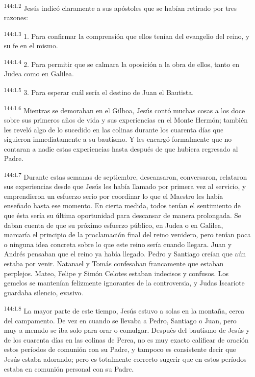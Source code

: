 \par
\textsuperscript{144:1.2} Jesús indicó claramente a sus apóstoles que se habían retirado por tres razones:

\par
\textsuperscript{144:1.3} 1. Para confirmar la comprensión que ellos tenían del evangelio del reino, y su fe en el mismo.

\par
\textsuperscript{144:1.4} 2. Para permitir que se calmara la oposición a la obra de ellos, tanto en Judea como en Galilea.

\par
\textsuperscript{144:1.5} 3. Para esperar cuál sería el destino de Juan el Bautista.

\par
\textsuperscript{144:1.6} Mientras se demoraban en el Gilboa, Jesús contó muchas cosas a los doce sobre sus primeros años de vida y sus experiencias en el Monte Hermón; también les reveló algo de lo sucedido en las colinas durante los cuarenta días que siguieron inmediatamente a su bautismo. Y les encargó formalmente que no contaran a nadie estas experiencias hasta después de que hubiera regresado al Padre.

\par
\textsuperscript{144:1.7} Durante estas semanas de septiembre, descansaron, conversaron, relataron sus experiencias desde que Jesús les había llamado por primera vez al servicio, y emprendieron un esfuerzo serio por coordinar lo que el Maestro les había enseñado hasta ese momento. En cierta medida, todos tenían el sentimiento de que ésta sería su última oportunidad para descansar de manera prolongada. Se daban cuenta de que su próximo esfuerzo público, en Judea o en Galilea, marcaría el principio de la proclamación final del reino venidero, pero tenían poca o ninguna idea concreta sobre lo que este reino sería cuando llegara. Juan y Andrés pensaban que el reino ya había llegado. Pedro y Santiago creían que aún estaba por venir. Natanael y Tomás confesaban francamente que estaban perplejos. Mateo, Felipe y Simón Celotes estaban indecisos y confusos. Los gemelos se mantenían felizmente ignorantes de la controversia, y Judas Iscariote guardaba silencio, evasivo.

\par
\textsuperscript{144:1.8} La mayor parte de este tiempo, Jesús estuvo a solas en la montaña, cerca del campamento. De vez en cuando se llevaba a Pedro, Santiago o Juan, pero muy a menudo se iba solo para orar o comulgar. Después del bautismo de Jesús y de los cuarenta días en las colinas de Perea, no es muy exacto calificar de oración estos períodos de comunión con su Padre, y tampoco es consistente decir que Jesús estaba adorando; pero es totalmente correcto sugerir que en estos períodos estaba en comunión personal con su Padre.

